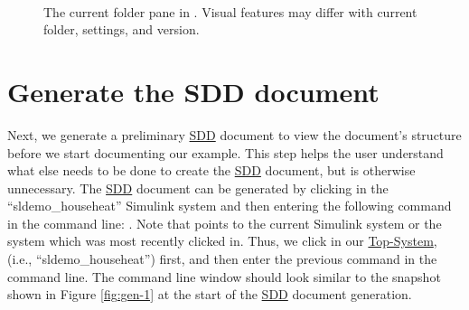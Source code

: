 \documentclass{mcscert}
\newcommand{\simulink}{Simulink}
\newcommand{\topsystemnolink}{Top-System} %
\newcommand{\topsystem}{\hyperref[def:topsystem]{\topsystemnolink{}}}
\begin{document}
\begin{figure}
	\caption{The current folder pane in \matlab{}. 
	Visual features may differ with current folder, settings, and \matlab{} version.}
	\centering
	\label{fig:current-folder-1}
	\\
\end{figure}

\section*{Generate the SDD document}
Next, we generate a preliminary \hyperref[acr:sdd]{SDD} document to view the document's structure before we start documenting our example. 
This step helps the user understand what else needs to be done to create the \hyperref[acr:sdd]{SDD} document, but is otherwise unnecessary. 
The \hyperref[acr:sdd]{SDD} document can be generated by clicking in the ``sldemo\_househeat'' \simulink{} system and then entering the following command in the \matlab{} command line: . 
Note that  points to the current \simulink{} system or the system which was most recently clicked in. 
Thus, we click in our \topsystem{},
(i.e., ``sldemo\_househeat'') first, and then enter the previous command in the \matlab{} command line. 
The \matlab{} command line window should look similar to the snapshot shown in Figure \ref{fig:gen-1} at the start of the \hyperref[acr:sdd]{SDD} document generation.
\end{document}
